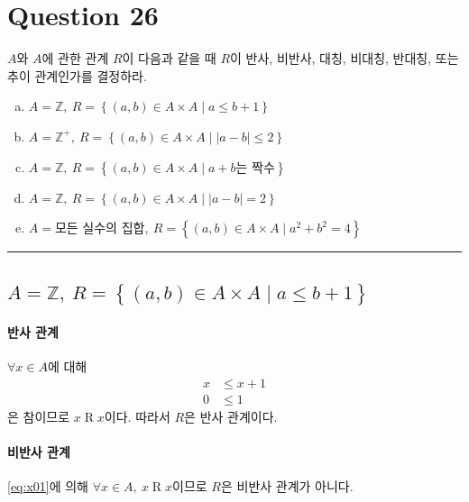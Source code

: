\documentclass{oblivoir}
\newenvironment{question}{ }{ \par\noindent\rule{\textwidth}{0.4pt} }
\begin{document}
\section{Question 26}
\begin{question}
    $A$와 $A$에 관한 관계 $R$이 다음과 같을 때
    $R$이 반사, 비반사, 대칭, 비대칭, 반대칭, 또는 추이 관계인가를 결정하라.

    \begin{enumerate}[(a)]
        \item $A = \mathbb Z,\ R = \left\{ (a,b) \in A \times A \mid a \leq b + 1 \right\}$
        \item $A = \mathbb Z^+,\ R = \left\{ (a,b) \in A \times A \mid |a-b| \leq 2 \right\}$
        \item $A = \mathbb Z,\ R = \left\{ (a,b) \in A \times A \mid a + b\textrm{는 짝수} \right\}$
        \item $A = \mathbb Z,\ R = \left\{ (a,b) \in A \times A \mid |a-b| = 2 \right\}$
        \item $A = \textrm{모든 실수의 집합},\ R = \left\{ (a,b) \in A \times A \mid a^2 + b^2 = 4 \right\}$
    \end{enumerate}
\end{question}

\subsection{$A = \mathbb Z,\ R = \left\{ (a,b) \in A \times A \mid a \leq b + 1 \right\}$}

\paragraph{반사 관계}
$\forall x \in A$에 대해
\begin{equation}\label{eq:x01}
    \begin{aligned}
        x &\leq x + 1 \\
        0 &\leq 1
    \end{aligned}
\end{equation}
은 참이므로 $x \mathrel R x$이다. 따라서 $R$은 반사 관계이다.

\paragraph{비반사 관계}
\eqref{eq:x01}에 의해 $\forall x \in A,\ x \mathrel R x$이므로
$R$은 비반사 관계가 아니다.
\end{document}
